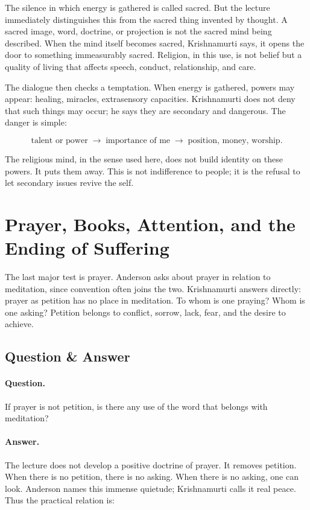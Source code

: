 The silence in which energy is gathered is called sacred. But the lecture immediately distinguishes this from the sacred thing invented by thought. A sacred image, word, doctrine, or projection is not the sacred mind being described. When the mind itself becomes sacred, Krishnamurti says, it opens the door to something immeasurably sacred. Religion, in this use, is not belief but a quality of living that affects speech, conduct, relationship, and care.

The dialogue then checks a temptation. When energy is gathered, powers may appear: healing, miracles, extrasensory capacities. Krishnamurti does not deny that such things may occur; he says they are secondary and dangerous. The danger is simple:

\begin{equation}
\text{talent or power}
\;\longrightarrow\;
\text{importance of me}
\;\longrightarrow\;
\text{position, money, worship}.
\end{equation}

The religious mind, in the sense used here, does not build identity on these powers. It puts them away. This is not indifference to people; it is the refusal to let secondary issues revive the self.

\section{Prayer, Books, Attention, and the Ending of Suffering}

The last major test is prayer. Anderson asks about prayer in relation to meditation, since convention often joins the two. Krishnamurti answers directly: prayer as petition has no place in meditation. To whom is one praying? Whom is one asking? Petition belongs to conflict, sorrow, lack, fear, and the desire to achieve.

\subsection{Question \& Answer}

\paragraph{Question.}
If prayer is not petition, is there any use of the word that belongs with meditation?

\paragraph{Answer.}
The lecture does not develop a positive doctrine of prayer. It removes petition. When there is no petition, there is no asking. When there is no asking, one can look. Anderson names this immense quietude; Krishnamurti calls it real peace. Thus the practical relation is:

